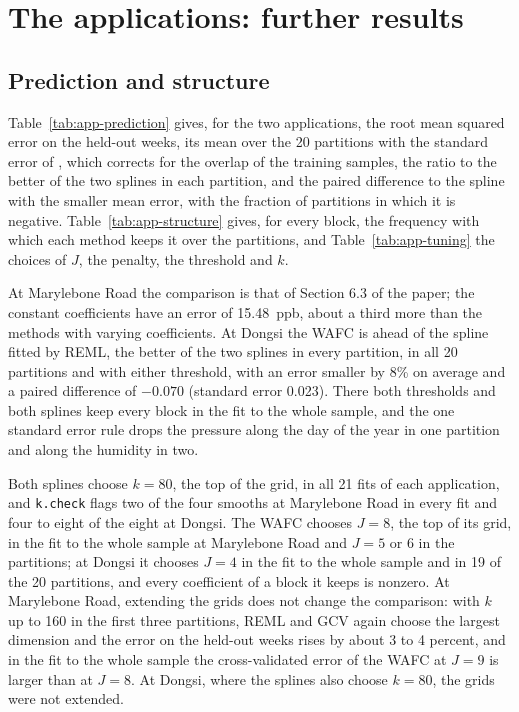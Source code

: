 \section{The applications: further results}
\label{sec:supp-app}

\subsection*{Prediction and structure}

Table~\ref{tab:app-prediction} gives, for the two applications, the root mean
squared error on the held-out weeks, its mean over the 20 partitions with the
standard error of \citet{Nadeau-Bengio-2003}, which corrects for the overlap
of the training samples, the ratio to the better of the two splines in each
partition, and the paired difference to the spline with the smaller mean
error, with the fraction of partitions in which it is negative.
Table~\ref{tab:app-structure} gives, for every block, the frequency with
which each method keeps it over the partitions, and
Table~\ref{tab:app-tuning} the choices of $J$, the penalty, the threshold
and $k$.

At Marylebone Road the comparison is that of Section 6.3 of the paper; the
constant coefficients have an error of 15.48~ppb, about a third more than
the methods with varying coefficients. At Dongsi the WAFC is ahead of the
spline fitted by REML, the better of the two splines in every partition, in
all 20 partitions and with either threshold, with an error smaller by 8\% on
average and a paired difference of $-0.070$ (standard error 0.023). There
both thresholds and both splines keep every block in the fit to the whole
sample, and the one standard error rule drops the pressure along the day of
the year in one partition and along the humidity in two.

Both splines choose $k = 80$, the top of the grid, in all 21 fits of each
application, and \texttt{k.check} flags two of the four smooths at
Marylebone Road in every fit and four to eight of the eight at Dongsi. The
WAFC chooses $J = 8$, the top of its grid, in the fit to the whole sample at
Marylebone Road and $J = 5$ or 6 in the partitions; at Dongsi it chooses
$J = 4$ in the fit to the whole sample and in 19 of the 20 partitions, and
every coefficient of a block it keeps is nonzero. At Marylebone Road,
extending the grids does not change the comparison: with $k$ up to 160 in
the first three partitions, REML and GCV again choose the largest dimension
and the error on the held-out weeks rises by about 3 to 4 percent, and in the
fit to the whole sample the cross-validated error of the WAFC at $J = 9$ is
larger than at $J = 8$. At Dongsi, where the splines also choose $k = 80$,
the grids were not extended.

